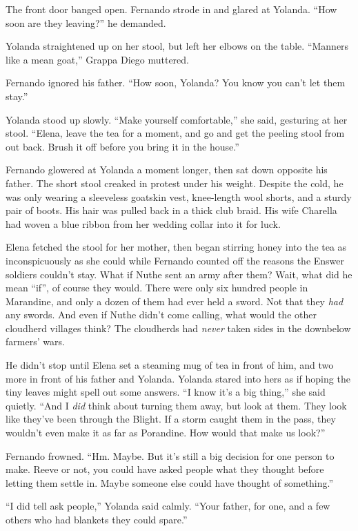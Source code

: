 \documentclass[10pt]{book}
\begin{document}
The front door banged open. Fernando strode in and glared at Yolanda. ``How soon are they leaving?'' he demanded.

Yolanda straightened up on her stool, but left her elbows on the table. ``Manners like a mean goat,'' Grappa Diego muttered.

Fernando ignored his father. ``How soon, Yolanda? You know you can't let them stay.''

Yolanda stood up slowly. ``Make yourself comfortable,'' she said, gesturing at her stool. ``Elena, leave the tea for a moment, and go and get the peeling stool from out back. Brush it off before you bring it in the house.''

Fernando glowered at Yolanda a moment longer, then sat down opposite his father. The short stool creaked in protest under his weight. Despite the cold, he was only wearing a sleeveless goatskin vest, knee-length wool shorts, and a sturdy pair of boots. His hair was pulled back in a thick club braid. His wife Charella had woven a blue ribbon from her wedding collar into it for luck.

Elena fetched the stool for her mother, then began stirring honey into the tea as inconspicuously as she could while Fernando counted off the reasons the Enswer soldiers couldn't stay. What if Nuthe sent an army after them? Wait, what did he mean ``if'', of course they would. There were only six hundred people in Marandine, and only a dozen of them had ever held a sword. Not that they \emph{had} any swords. And even if Nuthe didn't come calling, what would the other cloudherd villages think? The cloudherds had \emph{never} taken sides in the downbelow farmers' wars.

He didn't stop until Elena set a steaming mug of tea in front of him, and two more in front of his father and Yolanda. Yolanda stared into hers as if hoping the tiny leaves might spell out some answers. ``I know it's a big thing,'' she said quietly. ``And I \emph{did} think about turning them away, but look at them. They look like they've been through the Blight. If a storm caught them in the pass, they wouldn't even make it as far as Porandine. How would that make us look?''

Fernando frowned. ``Hm. Maybe. But it's still a big decision for one person to make. Reeve or not, you could have asked people what they thought before letting them settle in. Maybe someone else could have thought of something.''

``I did tell ask people,'' Yolanda said calmly. ``Your father, for one, and a few others who had blankets they could spare.''
\end{document}
